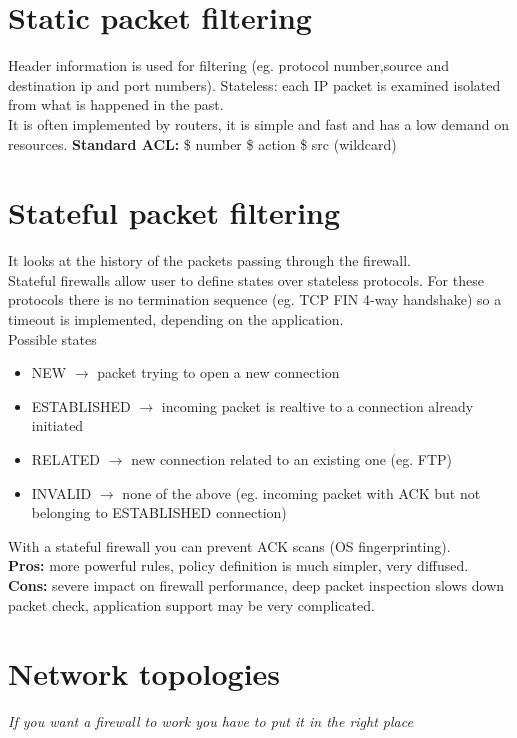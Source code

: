\documentclass[10pt,a4paper]{book}
\begin{document}
\section{Static packet filtering}
Header information is used for filtering (eg. protocol number,source and destination ip and port numbers). Stateless: each IP packet is examined isolated from what is happened in the past. \\
It is often implemented by routers, it is simple and fast and has a low demand on resources.
\textbf{Standard ACL:} \$ number \$ action \$ src (wildcard)	
\section{Stateful packet filtering}
It looks at the history of the packets passing through the firewall.\\
Stateful firewalls allow user to define states over stateless protocols. For these protocols there is no termination sequence (eg. TCP FIN 4-way handshake) so a timeout is implemented, depending on the application.\\
Possible states
\begin{itemize}
\item NEW $\to$ packet trying to open a new connection
\item ESTABLISHED $\to$ incoming packet is realtive to a connection already initiated
\item RELATED $\to$ new connection related to an existing one (eg. FTP)
\item INVALID $\to$ none of the above (eg. incoming packet with ACK  but not belonging to ESTABLISHED connection)
\end{itemize}
With a stateful firewall you can prevent ACK scans (OS fingerprinting).\\
\textbf{Pros:} more powerful rules, policy definition is much simpler, very diffused.\\
\textbf{Cons:} severe impact on firewall performance, deep packet inspection slows down packet check, application support may be very complicated.
\newpage
\section{Network topologies}
\emph{If you want a firewall to work you have to put it in the right place}
\end{document}
